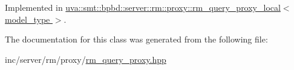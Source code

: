 Implemented in \hyperlink{classuva_1_1smt_1_1bpbd_1_1server_1_1rm_1_1proxy_1_1rm__query__proxy__local_a5f159493c0a0b9281b8bafb360bfd036}{uva\+::smt\+::bpbd\+::server\+::rm\+::proxy\+::rm\+\_\+query\+\_\+proxy\+\_\+local$<$ model\+\_\+type $>$}.



The documentation for this class was generated from the following file\+:\begin{DoxyCompactItemize}
\item 
inc/server/rm/proxy/\hyperlink{rm__query__proxy_8hpp}{rm\+\_\+query\+\_\+proxy.\+hpp}\end{DoxyCompactItemize}
